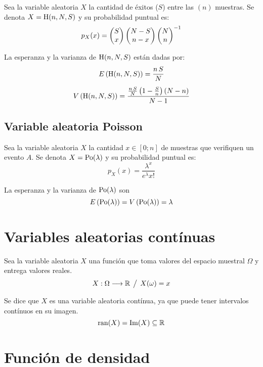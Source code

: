 \documentclass[a5paper,12pt,twoside]{book}
\begin{document}
Sea la variable aleatoria $X$ la cantidad de éxitos ($S$) entre las $(n)$ muestras.
Se denota $X=\operatorname{H}(n,N,S)$ y su probabilidad puntual es:
\begin{equation*}
    p_X(x) = \begin{pmatrix} {S}\\{x} \end{pmatrix} \begin{pmatrix} {N-S}\\{n-x} \end{pmatrix} \begin{pmatrix} {N}\\{n} \end{pmatrix}^{-1}
\end{equation*}

La esperanza y la varianza de $\operatorname{H}(n,N,S)$ están dadas por:
\begin{gather*}
    E \left(\operatorname{H}(n,N,S)\right) = \frac{n \, S}{N}
    \\[1ex]
    V \left(\operatorname{H}(n,N,S)\right) = \frac{\frac{n \, S}{N} \left(1- \frac{S}{n}\right) (N-n)}{N-1}
\end{gather*}


\subsection{Variable aleatoria Poisson}

Sea la variable aleatoria $X$ la cantidad $x \in [0;n]$ de muestras que verifiquen un evento $A$.
Se denota $X=\operatorname{Po}(\lambda)$ y su probabilidad puntual es:
\begin{equation*}
    p_X(x) = \frac{\lambda^x}{e^\lambda x!}
\end{equation*}

La esperanza y la varianza de $\operatorname{Po}(\lambda)$ son
\begin{equation*}
    E \left(\operatorname{Po}(\lambda)\right) = V \left(\operatorname{Po}(\lambda)\right) = \lambda
\end{equation*}


\section{Variables aleatorias contínuas}

Sea la variable aleatoria $X$ una función que toma valores del espacio muestral $\Omega$ y entrega valores reales.
\begin{equation*}
    X: \Omega \longrightarrow \mathbb{R} \hspace{1ex} \big/ \hspace{1ex} X(\omega) = x
\end{equation*}

Se dice que $X$ es una variable aleatoria contínua, ya que puede tener intervalos contínuos en su imagen.
\begin{equation*}
    \operatorname{ran}(X) = \operatorname{Im}(X) \subseteq \mathbb{R}
\end{equation*}


\section{Función de densidad}
\end{document}
